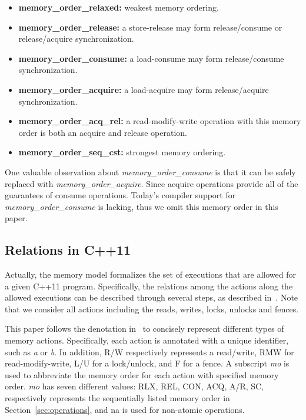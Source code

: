\documentclass[preprint, numbers, 10pt]{sigplanconf}
\begin{document}
\begin{itemize}
\item \textbf{memory\_order\_relaxed: } weakest memory ordering.
\item \textbf{memory\_order\_release: } a store-release may form
release/consume or release/acquire synchronization.
\item \textbf{memory\_order\_consume: } a load-consume may form
release/consume synchronization.
\item \textbf{memory\_order\_acquire: } a load-acquire may form
release/acquire synchronization.
\item \textbf{memory\_order\_acq\_rel: } a read-modify-write operation
with this memory order is both an acquire and release operation.
\item \textbf{memory\_order\_seq\_cst: } strongest memory ordering.  

\end{itemize}

One valuable observation about \textit{memory\_order\_consume} 
is that it can be safely replaced with \textit{memory\_order\_acquire}. 
Since acquire operations provide all of the guarantees of consume 
operations. Today’s compiler support for \textit{memory\_order\_consume} 
is lacking, thus we omit this memory order in this paper. 

\subsection{Relations in C++11}
\label{sec:relations}

Actually, the memory model formalizes the set of executions that are allowed
for a given C++11 program. Specifically, the relations among the
actions along the allowed executions can be described through several 
steps, as described in~\cite{Batty10,Batty:2011}. Note that we consider 
all actions including the reads, writes, locks, unlocks and fences. 

This paper follows the denotation in~\cite{Batty:2011} to concisely
represent different types of memory actions. 
Specifically, each action is annotated with a unique identifier, such as \textit{a} or \textit{b}. 
In addition, R/W respectively represents a read/write, RMW for read-modify-write, 
L/U for a lock/unlock, and F for a fence. A subscript \textit{mo} is used to abbreviate the memory
order for each action with specified memory order. 
\textit{mo} has seven different values: RLX, REL, CON,  ACQ, A/R, SC, respectively
represents the sequentially listed memory order in Section~\ref{sec:operations}, and 
na is used for non-atomic operations. 
\end{document}
